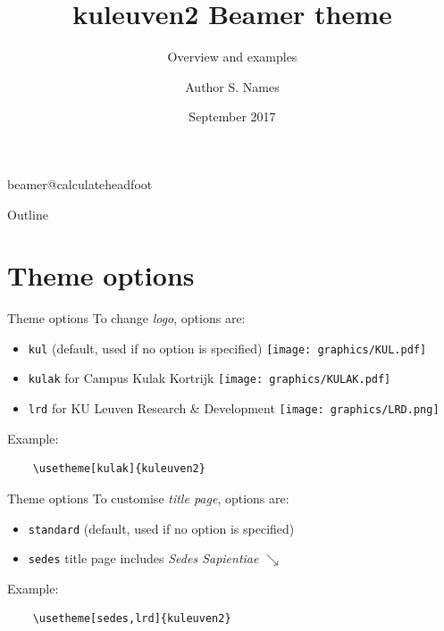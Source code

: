 \documentclass[11pt,t]{beamer}
\title[kuleuven2 \LaTeX\ Beamer theme]{kuleuven2 Beamer theme} %
\subtitle{Overview and examples}
\author{Author S. Names}
\institute{KU Leuven}
\date{September 2017}
\begin{document}
\csname beamer@calculateheadfoot\endcsname %


\begin{frame}
	\titlepage
\end{frame}
	

\begin{frame}{Outline}
	\hfill	{\large \parbox{.961\textwidth}{\tableofcontents[hideothersubsections]}}
\end{frame}







\section{Theme options}
\begin{frame}[fragile]{Theme options}  %
To change \emph{logo}, options are:
\begin{itemize}
	\item \texttt{kul} \qquad (default, used if no option is specified) \texttt{[image: graphics/KUL.pdf]}
	\item \texttt{kulak} \quad for Campus Kulak Kortrijk \texttt{[image: graphics/KULAK.pdf]}
	\item \texttt{lrd} \qquad for KU Leuven Research \& Development \texttt{[image: graphics/LRD.png]}
\end{itemize}

\vspace{24pt}
Example:
	\begin{verbatim}
	\usetheme[kulak]{kuleuven2}
	\end{verbatim}
\end{frame}




\begin{frame}[fragile]{Theme options}  %
To customise \emph{title page}, options are:
\begin{itemize}
	\item \texttt{standard} \quad (default, used if no option is specified) 
	\item \texttt{sedes} \qquad title page includes \textit{Sedes Sapientiae} $\searrow$
\end{itemize}

\vspace{24pt}
Example:
	\begin{verbatim}
	\usetheme[sedes,lrd]{kuleuven2}
	\end{verbatim}

\end{frame}
\end{document}
